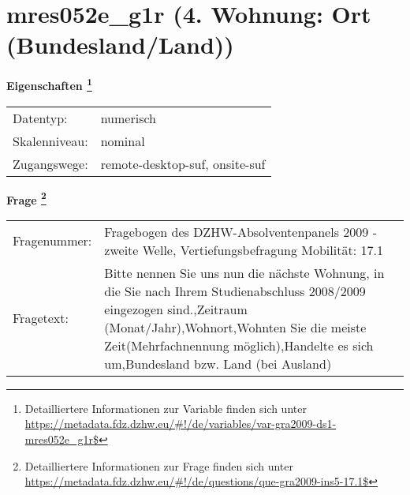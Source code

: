 
    \setcounter{footnote}{0}

    \vspace*{-1.8cm}
	\section{mres052e\_g1r (4. Wohnung: Ort (Bundesland/Land))}
	\label{section:mres052e_g1r}



    \vspace*{0.5cm}
    \noindent\textbf{Eigenschaften
	\footnote{Detailliertere Informationen zur Variable finden sich unter
		\url{https://metadata.fdz.dzhw.eu/\#!/de/variables/var-gra2009-ds1-mres052e_g1r$}}}\\
	\begin{tabularx}{\hsize}{@{}lX}
	Datentyp: & numerisch \\
	Skalenniveau: & nominal \\
	Zugangswege: &
	  remote-desktop-suf, 
	  onsite-suf
 \\
    \end{tabularx}



				\vspace*{0.5cm}
                \noindent\textbf{Frage
	                \footnote{Detailliertere Informationen zur Frage finden sich unter
		              \url{https://metadata.fdz.dzhw.eu/\#!/de/questions/que-gra2009-ins5-17.1$}}}\\
				\begin{tabularx}{\hsize}{@{}lX}
					Fragenummer: &
					  Fragebogen des DZHW-Absolventenpanels 2009 - zweite Welle, Vertiefungsbefragung Mobilität:
					  17.1
 \\
					Fragetext: & Bitte nennen Sie uns nun die nächste Wohnung, in die Sie nach Ihrem Studienabschluss 2008/2009 eingezogen sind.,Zeitraum (Monat/Jahr),Wohnort,Wohnten Sie die meiste Zeit(Mehrfachnennung möglich),Handelte es sich um,Bundesland bzw. Land (bei Ausland) \\
				\end{tabularx}





